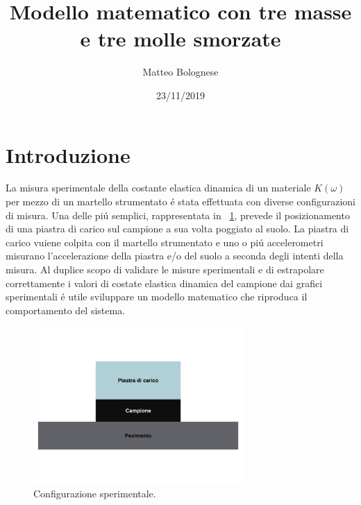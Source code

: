 \documentclass[12pt,a4paper]{article}
\begin{document}
 	\title{Modello matematico con tre masse e tre molle smorzate} \author{Matteo Bolognese}
 	\date{23/11/2019}
 	\maketitle
 	
 \section{Introduzione}
	La misura sperimentale della costante elastica dinamica di un materiale $K(\omega)$ per mezzo di un martello strumentato \'e stata effettuata con diverse configurazioni di misura. Una delle pi\'u semplici, rappresentata in \figurename~\ref{fig:Phisical-configuration}, prevede il posizionamento di una piastra di carico sul campione a sua volta poggiato al suolo. La piastra di carico vuiene colpita con il martello strumentato e uno o pi\'u accelerometri misurano l'accelerazione della piastra e/o del suolo a seconda degli intenti della misura.
	Al duplice scopo di validare le misure sperimentali e di estrapolare correttamente i valori di costate elastica dinamica del campione dai grafici sperimentali \'e utile sviluppare un modello matematico che riproduca il comportamento del sistema.
	
	\begin{figure}
		\centering
		\includegraphics[width=8cm]{Phisical-system.jpg}
		\caption{Configurazione sperimentale.}
		\label{fig:Phisical-configuration}
	\end{figure}
 	
\end{document}
